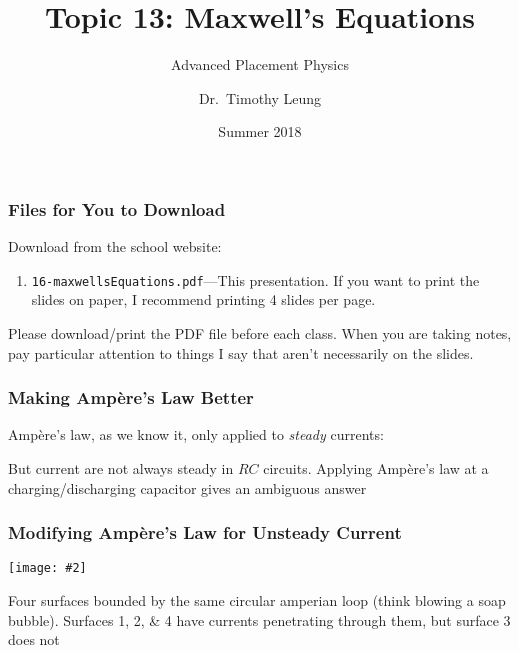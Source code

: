 \documentclass[12pt,aspectratio=169]{beamer}
\title{Topic 13: Maxwell's Equations}
\subtitle{Advanced Placement Physics}
\author[TML]{Dr.\ Timothy Leung}
\institute{Olympiads School}
\date{Summer 2018}
\newcommand{\pic}[2]{\texttt{[image: \#2]}}\newcommand{\mb}[1]{\mathbf{#1}}
\newcommand{\eq}[2]{\vspace{#1}{\Large\begin{displaymath}#2\end{displaymath}}}
\begin{document}
\begin{frame}
  \maketitle
\end{frame}



\begin{frame}
  \frametitle{Files for You to Download}
  Download from the school website:
  \begin{enumerate}
  \item\texttt{16-maxwellsEquations.pdf}---This
    presentation. If you want to print the slides on paper, I recommend
    printing 4 slides per page.
  \end{enumerate}

  \vspace{.2in}Please download/print the PDF file before each class. When you
  are taking notes, pay particular attention to things I say that aren't
  necessarily on the slides.
\end{frame}


\begin{frame}
  \frametitle{Making Amp\`{e}re's Law Better}

  Amp\`{e}re's law, as we know it, only applied to \emph{steady} currents:

  \eq{-.1in}{
    \oint_C \mb{B}\cdot d\boldsymbol{\ell}=\mu_0 I
  }

  But current are not always steady in $RC$ circuits. Applying Amp\`{e}re's law
  at a charging/discharging capacitor gives an ambiguous answer
\end{frame}

\begin{frame}
  \frametitle{Modifying Amp\`{e}re's Law for Unsteady Current}

  \begin{center}
    \pic{.3}{mag_displacement_fig3.jpg}
  \end{center}

  Four surfaces bounded by the same circular amperian loop (think blowing a
  soap bubble). Surfaces \numlist{1;2;4} have currents penetrating through
  them, but surface \num{3} does not
\end{frame}
\end{document}
